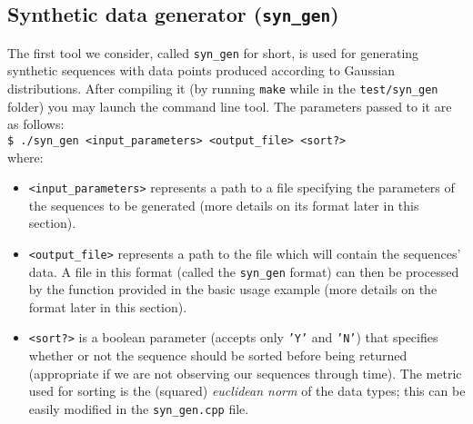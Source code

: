 \documentclass[12pt]{article}
\newcommand{\shellcmd}[1]{\\\indent\indent\texttt{\footnotesize\$ #1}}
\begin{document}
	\subsection{Synthetic data generator ({\tt syn\_gen})}
	The first tool we consider, called {\tt syn\_gen} for short, is used for generating synthetic sequences with data points produced according to Gaussian distributions. After compiling it (by running {\tt make} while in the {\tt test/syn\_gen} folder) you may launch the command line tool. The parameters passed to it are as follows:
	\shellcmd{./syn\_gen <input\_parameters> <output\_file> <sort?\! [Y/N]>}\\
	where:
	\begin{itemize}
		\item {\tt <input\_parameters>} represents a path to a file specifying the parameters of the sequences to be generated (more details on its format later in this section).
		\item {\tt <output\_file>} represents a path to the file which will contain the sequences' data. A file in this format (called the {\tt syn\_gen} format) can then be processed by the function provided in the basic usage example (more details on the format later in this section).
		\item {\tt <sort?>} is a boolean parameter (accepts only {\tt 'Y'} and {\tt 'N'}) that specifies whether or not the sequence should be sorted before being returned (appropriate if we are not observing our sequences through time). The metric used for sorting is the (squared) \emph{euclidean norm} of the data types; this can be easily modified in the {\tt syn\_gen.cpp} file.
	\end{itemize} 
\end{document}
